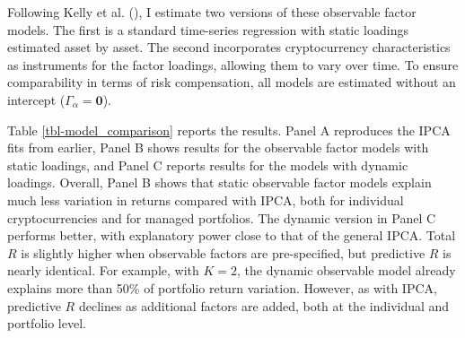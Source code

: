 \documentclass[
  12pt,
  a4paper,
  openany]{scrbook}
\begin{document}
Following Kelly et al.
(), I estimate two
versions of these observable factor models. The first is a standard
time-series regression with static loadings estimated asset by asset.
The second incorporates cryptocurrency characteristics as instruments
for the factor loadings, allowing them to vary over time. To ensure
comparability in terms of risk compensation, all models are estimated
without an intercept (\(\Gamma_\alpha = \mathbf{0}\)).

Table \ref{tbl-model_comparison} reports the results. Panel A reproduces
the IPCA fits from earlier, Panel B shows results for the observable
factor models with static loadings, and Panel C reports results for the
models with dynamic loadings. Overall, Panel B shows that static
observable factor models explain much less variation in returns compared
with IPCA, both for individual cryptocurrencies and for managed
portfolios. The dynamic version in Panel C performs better, with
explanatory power close to that of the general IPCA. Total \(R\) is
slightly higher when observable factors are pre-specified, but
predictive \(R\) is nearly identical. For example, with \(K=2\), the
dynamic observable model already explains more than 50\% of portfolio
return variation. However, as with IPCA, predictive \(R\) declines as
additional factors are added, both at the individual and portfolio
level.
\end{document}
